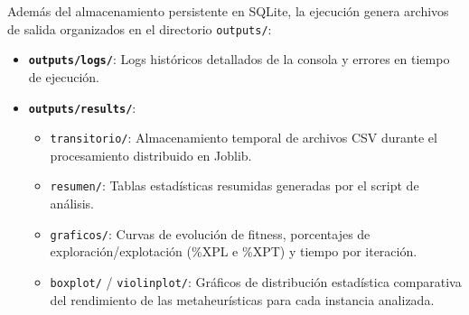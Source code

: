 Además del almacenamiento persistente en SQLite, la ejecución genera archivos de salida organizados en el directorio \texttt{outputs/}:
\begin{itemize}
    \item \textbf{\texttt{outputs/logs/}}: Logs históricos detallados de la consola y errores en tiempo de ejecución.
    \item \textbf{\texttt{outputs/results/}}:
    \begin{itemize}
        \item \texttt{transitorio/}: Almacenamiento temporal de archivos CSV durante el procesamiento distribuido en Joblib.
        \item \texttt{resumen/}: Tablas estadísticas resumidas generadas por el script de análisis.
        \item \texttt{graficos/}: Curvas de evolución de fitness, porcentajes de exploración/explotación (\%XPL e \%XPT) y tiempo por iteración.
        \item \texttt{boxplot/} / \texttt{violinplot/}: Gráficos de distribución estadística comparativa del rendimiento de las metaheurísticas para cada instancia analizada.
    \end{itemize}
\end{itemize}